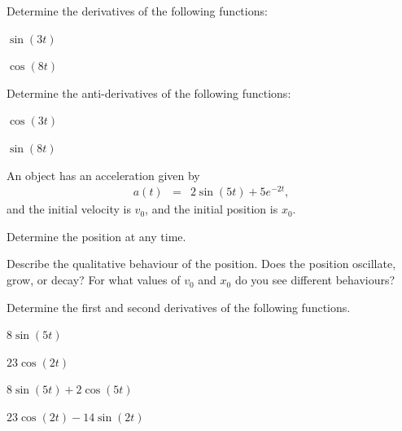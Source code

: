 
\begin{problem}
\item Determine the derivatives of the following functions:
  \begin{subproblem}
  \item $\sin(3t)$
    \vfill
  \item $\cos(8t)$
    \vfill
  \end{subproblem}
\item Determine the anti-derivatives of the following functions:
  \begin{subproblem}
  \item $\cos(3t)$
    \vfill
  \item $\sin(8t)$
    \vfill
  \end{subproblem}
\end{problem}


\begin{problem}
\item An object has an acceleration given by
  \begin{eqnarray*}
    a(t) & = & 2\sin(5t) + 5e^{-2t},
  \end{eqnarray*}
  and the initial velocity is $v_0$, and the initial position is $x_0$.
  \begin{subproblem}
  \item Determine the position at any time.
    \vfill
  \item Describe the qualitative behaviour of the position. Does the position
    oscillate, grow, or decay? For what values of $v_0$ and $x_0$ do
    you see different behaviours?
    \vfill
  \end{subproblem}

  \clearpage

\item Determine the first and second derivatives of the following functions.
  \begin{subproblem}
  \item $8\sin(5t)$
    \vfill
  \item $23\cos(2t)$
    \vfill
  \item $8\sin(5t)+2\cos(5t)$
    \vfill
  \item $23\cos(2t)-14\sin(2t)$
    \vfill
  \end{subproblem}

\end{problem}

